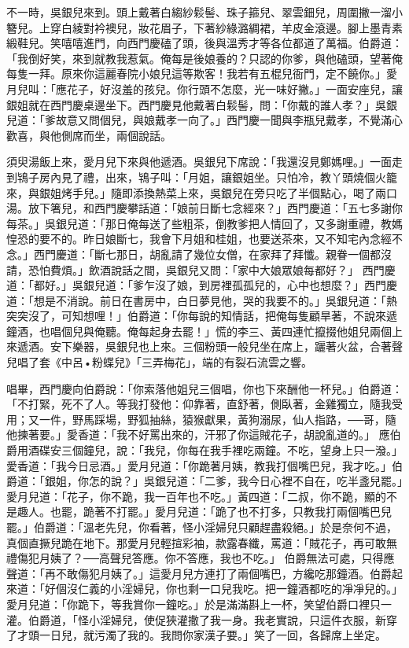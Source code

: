 不一時，吳銀兒來到。頭上戴著白縐紗鬏髻、珠子箍兒、翠雲鈿兒，周圍撇一溜小簪兒。上穿白綾對衿襖兒，妝花眉子，下著紗綠潞綢裙，羊皮金滾邊。腳上墨青素緞鞋兒。笑嘻嘻進門，向西門慶磕了頭，後與溫秀才等各位都道了萬福。伯爵道：「我倒好笑，來到就教我惹氣。俺每是後娘養的？只認的你爹，與他磕頭，望著俺每隻一拜。原來你這麗春院小娘兒這等欺客！我若有五棍兒衙門，定不饒你。」愛月兒叫：「應花子，好沒羞的孩兒。你行頭不怎麼，光一味好撇。」一面安座兒，讓銀姐就在西門慶桌邊坐下。西門慶見他戴著白鬏髻，問：「你戴的誰人孝？」吳銀兒道：「爹故意又問個兒，與娘戴孝一向了。」西門慶一聞與李瓶兒戴孝，不覺滿心歡喜，與他側席而坐，兩個說話。

須臾湯飯上來，愛月兒下來與他遞酒。吳銀兒下席說：「我還沒見鄭媽哩。」一面走到鴇子房內見了禮，出來，鴇子叫：「月姐，讓銀姐坐。只怕冷，教丫頭燒個火籠來，與銀姐烤手兒。」隨即添換熱菜上來，吳銀兒在旁只吃了半個點心，喝了兩口湯。放下箸兒，和西門慶攀話道：「娘前日斷七念經來？」西門慶道：「五七多謝你每茶。」吳銀兒道：「那日俺每送了些粗茶，倒教爹把人情回了，又多謝重禮，教媽惶恐的要不的。昨日娘斷七，我會下月姐和桂姐，也要送茶來，又不知宅內念經不念。」西門慶道：「斷七那日，胡亂請了幾位女僧，在家拜了拜懺。親眷一個都沒請，恐怕費煩。」飲酒說話之間，吳銀兒又問：「家中大娘眾娘每都好？」 西門慶道：「都好。」吳銀兒道：「爹乍沒了娘，到房裡孤孤兒的，心中也想麼？」西門慶道：「想是不消說。前日在書房中，白日夢見他，哭的我要不的。」吳銀兒道：「熱突突沒了，可知想哩！」伯爵道：「你每說的知情話，把俺每隻顧旱著，不說來遞鐘酒，也唱個兒與俺聽。俺每起身去罷！」慌的李三、黃四連忙攛掇他姐兒兩個上來遞酒。安下樂器，吳銀兒也上來。三個粉頭一般兒坐在席上，躧著火盆，合著聲兒唱了套《中呂•粉蝶兒》「三弄梅花」，端的有裂石流雲之響。

唱畢，西門慶向伯爵說：「你索落他姐兒三個唱，你也下來酬他一杯兒。」伯爵道：「不打緊，死不了人。等我打發他：仰靠著，直舒著，側臥著，金雞獨立，隨我受用；又一件，野馬踩場，野狐抽絲，猿猴獻果，黃狗溺尿，仙人指路，──哥，隨他揀著要。」愛香道：「我不好罵出來的，汗邪了你這賊花子，胡說亂道的。」 應伯爵用酒碟安三個鐘兒，說：「我兒，你每在我手裡吃兩鐘。不吃，望身上只一潑。」愛香道：「我今日忌酒。」愛月兒道：「你跪著月姨，教我打個嘴巴兒，我才吃。」伯爵道：「銀姐，你怎的說？」吳銀兒道：「二爹，我今日心裡不自在，吃半盞兒罷。」愛月兒道：「花子，你不跪，我一百年也不吃。」黃四道：「二叔，你不跪，顯的不是趣人。也罷，跪著不打罷。」愛月兒道：「跪了也不打多，只教我打兩個嘴巴兒罷。」伯爵道：「溫老先兒，你看著，怪小淫婦兒只顧趕盡殺絕。」於是奈何不過，真個直撅兒跪在地下。那愛月兒輕揎彩袖，款露春纖，罵道：「賊花子，再可敢無禮傷犯月姨了？──高聲兒答應。你不答應，我也不吃。」 伯爵無法可處，只得應聲道：「再不敢傷犯月姨了。」這愛月兒方連打了兩個嘴巴，方纔吃那鐘酒。伯爵起來道：「好個沒仁義的小淫婦兒，你也剩一口兒我吃。把一鐘酒都吃的凈凈兒的。」愛月兒道：「你跪下，等我賞你一鐘吃。」於是滿滿斟上一杯，笑望伯爵口裡只一灌。伯爵道，「怪小淫婦兒，使促狹灌撒了我一身。我老實說，只這件衣服，新穿了才頭一日兒，就污濁了我的。我問你家漢子要。」笑了一回，各歸席上坐定。

